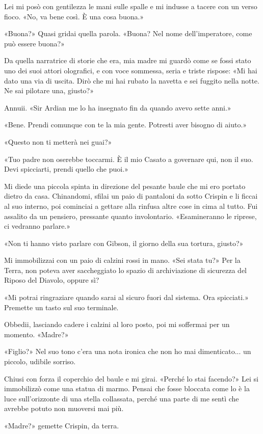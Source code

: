 Lei mi posò con gentilezza le mani sulle spalle e mi indusse a tacere
con un verso fioco. «No, va bene così. È una cosa buona.»

«Buona?» Quasi gridai quella parola. «Buona? Nel nome dell'imperatore,
come può essere buona?»

Da quella narratrice di storie che era, mia madre mi guardò come se
fossi stato uno dei suoi attori olografici, e con voce sommessa, seria e
triste rispose: «Mi hai dato una via di uscita. Dirò che mi hai rubato
la navetta e sei fuggito nella notte. Ne sai pilotare una, giusto?»

Annuii. «Sir Ardian me lo ha insegnato fin da quando avevo sette anni.»

«Bene. Prendi comunque con te la mia gente. Potresti aver bisogno di
aiuto.»

«Questo non ti metterà nei guai?»

«Tuo padre non oserebbe toccarmi. È il mio Casato a governare qui, non
il suo. Devi spicciarti, prendi quello che puoi.»

Mi diede una piccola spinta in direzione del pesante baule che mi ero
portato dietro da casa. Chinandomi, sfilai un paio di pantaloni da sotto
Crispin e li ficcai al suo interno, poi cominciai a gettare alla rinfusa
altre cose in cima al tutto. Fui assalito da un pensiero, pressante
quanto involontario. «Esamineranno le riprese, ci vedranno parlare.»

«Non ti hanno visto parlare con Gibson, il giorno della sua tortura,
giusto?»

Mi immobilizzai con un paio di calzini rossi in mano. «Sei stata tu?»
Per la Terra, non poteva aver saccheggiato lo spazio di archiviazione di
sicurezza del Riposo del Diavolo, oppure sì?

«Mi potrai ringraziare quando sarai al sicuro fuori dal sistema. Ora
spicciati.» Premette un tasto sul suo terminale.

Obbedii, lasciando cadere i calzini al loro posto, poi mi soffermai per
un momento. «Madre?»

«Figlio?» Nel suo tono c'era una nota ironica che non ho mai
dimenticato... un piccolo, udibile sorriso.

Chiusi con forza il coperchio del baule e mi girai. «Perché lo stai
facendo?» Lei si immobilizzò come una statua di marmo. Pensai che fosse
bloccata come lo è la luce sull'orizzonte di una stella collassata,
perché una parte di me sentì che avrebbe potuto non muoversi mai più.

«Madre?» gemette Crispin, da terra.

